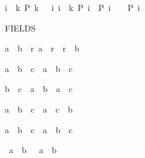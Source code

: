 \begin{isabellebody}
\begin{isamarkuptext}
\begin{isabelle}%
{\isasymlbrakk}i\ {\isacharless}\ k{\isacharsemicolon}\ P\ {\isacharparenleft}k\ {\isacharminus}\ {}{\isacharparenright}{\isacharsemicolon}\ {\isasymAnd}i{\isachardot}\ {\isasymlbrakk}i\ {\isacharless}\ k{\isacharsemicolon}\ P\ i{\isasymrbrakk}\ {\isasymLongrightarrow}\ P\ {\isacharparenleft}i\ {\isacharminus}\ {}{\isacharparenright}{\isasymrbrakk}\ {\isasymLongrightarrow}\ P\ i%
\end{isabelle}
%
\end{isamarkuptext}%
\isamarkuptrue%
%
\begin{isamarkuptext}%
FIELDS

\begin{isabelle}%
a\ {\isacharless}\ b\ {\isasymLongrightarrow}\ {\isasymexists}r{\isachardot}\ a\ {\isacharless}\ r\ {\isasymand}\ r\ {\isacharless}\ b%
\end{isabelle}

\begin{isabelle}%
a\ {\isacharasterisk}\ {\isacharparenleft}b\ {\isacharslash}\ c{\isacharparenright}\ {\isacharequal}\ a\ {\isacharasterisk}\ b\ {\isacharslash}\ c%
\end{isabelle}

\begin{isabelle}%
b\ {\isacharslash}\ c\ {\isacharasterisk}\ a\ {\isacharequal}\ b\ {\isacharasterisk}\ a\ {\isacharslash}\ c%
\end{isabelle}

\begin{isabelle}%
a\ {\isacharslash}\ {\isacharparenleft}b\ {\isacharslash}\ c{\isacharparenright}\ {\isacharequal}\ a\ {\isacharasterisk}\ c\ {\isacharslash}\ b%
\end{isabelle}

\begin{isabelle}%
a\ {\isacharslash}\ b\ {\isacharslash}\ c\ {\isacharequal}\ a\ {\isacharslash}\ {\isacharparenleft}b\ {\isacharasterisk}\ c{\isacharparenright}%
\end{isabelle}

\begin{isabelle}%
{\isacharminus}\ {\isacharparenleft}a\ {\isacharslash}\ b{\isacharparenright}\ {\isacharequal}\ {\isacharminus}\ a\ {\isacharslash}\ b%
\end{isabelle}


\end{isamarkuptext}
\end{isabellebody}
